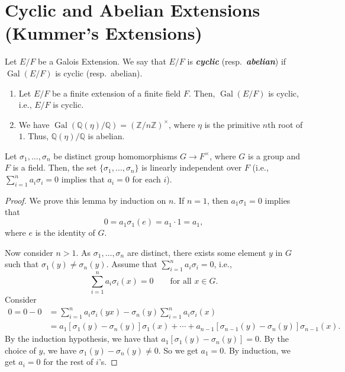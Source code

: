 \documentclass[twoside]{article}
\DeclareMathOperator\Gal{Gal}
\newcommand\Z{\mathbb Z}
\newcommand\Q{\mathbb Q}
\theoremstyle{remark}
\newcommand*\term[1]{\textbf{\textit{\mathversion{bold}#1}}}
\begin{document}
\section{Cyclic and Abelian Extensions (Kummer's Extensions)}

\begin{definition}
  Let \(E/F\) be a Galois Extension. We say that \(E/F\) is \term{cyclic} (resp.\ \term{abelian}) if \(\Gal(E/F)\) is cyclic (resp.\ abelian).
\end{definition}

\begin{examples}
  \begin{enumerate}[label=\arabic*.]
    \item Let \(E/F\) be a finite extension of a finite field \(F\). Then, \(\Gal(E/F)\) is cyclic, i.e., \(E/F\) is cyclic.
    \item We have \(\Gal(\Q(\eta)/\Q) = (\Z/n\Z)^\times\), where \(\eta\) is the primitive \(n\)th root of \(1\). Thus, \(\Q(\eta)/\Q\) is abelian.
  \end{enumerate}
\end{examples}

\begin{lemma}
  Let \(\sigma_1, \dots, \sigma_n\) be distinct group homomorphisms \(G \to F^\times\), where \(G\) is a group and \(F\) is a field. Then, the set \(\{\sigma_1, \dots, \sigma_n\}\) is linearly independent over \(F\) (i.e., \(\sum_{i=1}^n a_i \sigma_i = 0\) implies that \(a_i = 0\) for each \(i\)).
\end{lemma}

\begin{proof}
  We prove this lemma by induction on \(n\). If \(n=1\), then \(a_1 \sigma_1 = 0\) implies that
  \[ 0 = a_1\sigma_1(e) = a_1 \cdot 1 = a_1, \]
  where \(e\) is the identity of \(G\).
  
  Now consider \(n > 1\). As \(\sigma_1, \dots, \sigma_n\) are distinct, there exists some element \(y\) in \(G\) such that \(\sigma_1(y) \neq \sigma_n(y)\). Assume that \(\sum_{i=1}^n a_i \sigma_i = 0\), i.e.,
  \[ \sum_{i=1}^n a_i \sigma_i(x) = 0 \qquad \text{for all } x \in G. \]
  Consider
  \begin{align*}
    0 = 0 - 0 & = \sum_{i=1}^n a_i \sigma_i (yx) - \sigma_n(y) \sum_{i=1}^n a_i \sigma_i (x) \\
    & = a_1 \left[ \sigma_1(y) - \sigma_n(y) \right] \sigma_1(x) + \cdots + a_{n-1} \left[ \sigma_{n-1}(y) - \sigma_n(y) \right] \sigma_{n-1} (x).
  \end{align*}
  By the induction hypothesis, we have that \(a_1 [\sigma_1(y) - \sigma_n(y)] = 0\). By the choice of \(y\), we have \(\sigma_1(y) - \sigma_n(y) \neq 0\). So we get \(a_1 = 0\). By induction, we get \(a_i = 0\) for the rest of \(i\)'s.
\end{proof}
\end{document}

